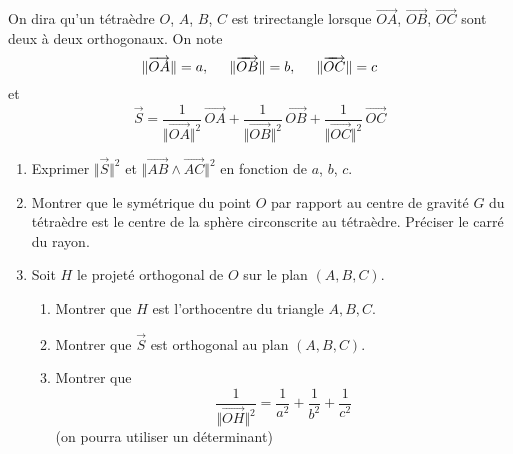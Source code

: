 On dira qu'un tétraèdre $O$, $A$, $B$, $C$ est trirectangle lorsque $\overrightarrow{OA}$, $\overrightarrow{OB}$, $\overrightarrow{OC}$ sont deux à deux orthogonaux. On note
\begin{displaymath}
 \Vert \overrightarrow{OA}\Vert = a,\hspace{0.5cm}
 \Vert \overrightarrow{OB}\Vert = b,\hspace{0.5cm}
 \Vert \overrightarrow{OC}\Vert = c
\end{displaymath}
et 
\begin{displaymath}
 \overrightarrow S =
\frac{1}{\Vert \overrightarrow{OA} \Vert^2}\, \overrightarrow{OA} +
\frac{1}{\Vert \overrightarrow{OB} \Vert^2}\, \overrightarrow{OB} +
\frac{1}{\Vert \overrightarrow{OC} \Vert^2}\, \overrightarrow{OC} 
\end{displaymath}

\begin{enumerate}
 \item Exprimer $\Vert \overrightarrow S \Vert^2$ et $\Vert \overrightarrow{AB}\wedge \overrightarrow{AC}\Vert^2$  en fonction de $a$, $b$, $c$.  
 \item Montrer que le symétrique du point $O$ par rapport au centre de gravité $G$ du tétraèdre est le centre de la sphère circonscrite au tétraèdre. Préciser le carré du rayon.
 \item Soit $H$ le projeté orthogonal de $O$ sur le plan $(A,B,C)$.
\begin{enumerate}
 \item Montrer que $H$ est l'orthocentre du triangle $A,B,C$.
 \item Montrer que $\overrightarrow S$ est orthogonal au plan $(A,B,C)$.
 \item Montrer que
\begin{displaymath}
 \frac{1}{\Vert \overrightarrow{OH}\Vert^2} = \frac{1}{a^2}+\frac{1}{b^2}+\frac{1}{c^2}
\end{displaymath}
(on pourra utiliser un déterminant)

\end{enumerate}

\end{enumerate}
